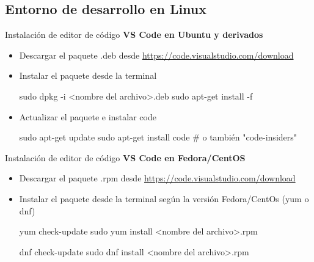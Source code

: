 \subsection{Entorno de desarrollo en Linux}


\begin{frame}[fragile]{Instalación de editor de código}
  \textbf{VS Code en Ubuntu y derivados}
  \begin{itemize}[<+(1)->]
   \item Descargar el paquete .deb desde \url{https://code.visualstudio.com/download}
   \item Instalar el paquete desde la terminal
    \begin{mintedbash}
      sudo dpkg -i <nombre del archivo>.deb
      sudo apt-get install -f 
    \end{mintedbash} 
   \item Actualizar el paquete e instalar code
     \begin{mintedbash}
       sudo apt-get update
       sudo apt-get install code # o también  "code-insiders"
     \end{mintedbash}
  \end{itemize}
\end{frame}

\begin{frame}[fragile]{Instalación de editor de código}
  \textbf{VS Code en Fedora/CentOS}
  \begin{itemize}[<+(1)->]
   \item Descargar el paquete .rpm desde \url{https://code.visualstudio.com/download}
   \item Instalar el paquete desde la terminal según la versión Fedora/CentOs (yum o dnf)
    \begin{mintedbash}
      yum check-update
      sudo yum install <nombre del archivo>.rpm 
    \end{mintedbash}
    \begin{mintedbash}
      dnf check-update
      sudo dnf install <nombre del archivo>.rpm 
    \end{mintedbash}
  \end{itemize}
\end{frame}

